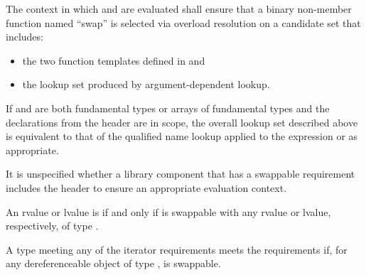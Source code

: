 \pnum
The context in which  and  are evaluated shall
ensure that a binary non-member function named ``swap'' is selected via overload
resolution on a candidate set that includes:
\begin{itemize}
\item the two  function templates defined in
 and

\item the lookup set produced by argument-dependent lookup.
\end{itemize}
\begin{note}
If  and  are both fundamental types or arrays of
fundamental types and the declarations from the header  are in
scope, the overall lookup set described above is equivalent to that of the
qualified name lookup applied to the expression  or
 as appropriate.
\end{note}
\begin{note}
It is unspecified whether a library component that has a swappable
requirement includes the header  to ensure an appropriate
evaluation context.
\end{note}

\pnum
An rvalue or lvalue  is  if and only if  is
swappable with any rvalue or lvalue, respectively, of type .

\pnum
A type  meeting any of the iterator requirements
meets the  requirements if,
for any dereferenceable object
 of type ,
 is swappable.

